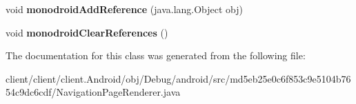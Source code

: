 \begin{DoxyCompactItemize}
\item 
\hypertarget{classmd5eb25e0c6f853c9e5104b7654c9dc6cdf_1_1NavigationPageRenderer_abb3e61839c8499926a4b57fa15f5b95c}{}void {\bfseries monodroid\+Add\+Reference} (java.\+lang.\+Object obj)\label{classmd5eb25e0c6f853c9e5104b7654c9dc6cdf_1_1NavigationPageRenderer_abb3e61839c8499926a4b57fa15f5b95c}

\item 
\hypertarget{classmd5eb25e0c6f853c9e5104b7654c9dc6cdf_1_1NavigationPageRenderer_adfc1ea632e04d2c6a561824f5977d5bd}{}void {\bfseries monodroid\+Clear\+References} ()\label{classmd5eb25e0c6f853c9e5104b7654c9dc6cdf_1_1NavigationPageRenderer_adfc1ea632e04d2c6a561824f5977d5bd}

\end{DoxyCompactItemize}


The documentation for this class was generated from the following file\+:\begin{DoxyCompactItemize}
\item 
client/client/client.\+Android/obj/\+Debug/android/src/md5eb25e0c6f853c9e5104b7654c9dc6cdf/Navigation\+Page\+Renderer.\+java\end{DoxyCompactItemize}
